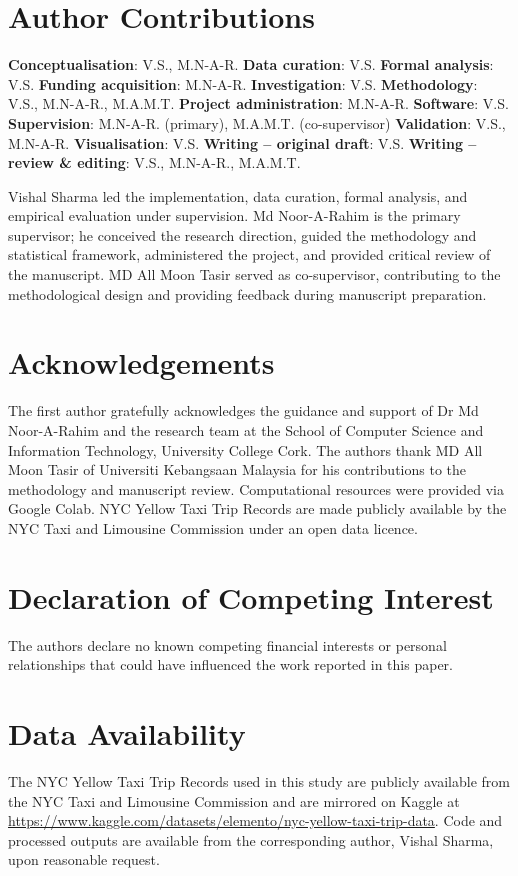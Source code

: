 \documentclass[a4paper,fleqn]{cas-dc}
\begin{document}
\section*{Author Contributions}
\textbf{Conceptualisation}: V.S., M.N-A-R.
\textbf{Data curation}: V.S.
\textbf{Formal analysis}: V.S.
\textbf{Funding acquisition}: M.N-A-R.
\textbf{Investigation}: V.S.
\textbf{Methodology}: V.S., M.N-A-R., M.A.M.T.
\textbf{Project administration}: M.N-A-R.
\textbf{Software}: V.S.
\textbf{Supervision}: M.N-A-R. (primary), M.A.M.T. (co-supervisor)
\textbf{Validation}: V.S., M.N-A-R.
\textbf{Visualisation}: V.S.
\textbf{Writing -- original draft}: V.S.
\textbf{Writing -- review \& editing}: V.S., M.N-A-R., M.A.M.T.

Vishal Sharma led the implementation, data curation, formal analysis, and empirical evaluation under supervision.  Md Noor-A-Rahim is the primary supervisor; he conceived the research direction, guided the methodology and statistical framework, administered the project, and provided critical review of the manuscript.  MD All Moon Tasir served as co-supervisor, contributing to the methodological design and providing feedback during manuscript preparation.

\section*{Acknowledgements}
The first author gratefully acknowledges the guidance and support of Dr Md Noor-A-Rahim and the research team at the School of Computer Science and Information Technology, University College Cork.  The authors thank MD All Moon Tasir of Universiti Kebangsaan Malaysia for his contributions to the methodology and manuscript review.  Computational resources were provided via Google Colab.  NYC Yellow Taxi Trip Records are made publicly available by the NYC Taxi and Limousine Commission under an open data licence.

\section*{Declaration of Competing Interest}
The authors declare no known competing financial interests or personal relationships that could have influenced the work reported in this paper.

\section*{Data Availability}
The NYC Yellow Taxi Trip Records used in this study are publicly available from the NYC Taxi and Limousine Commission and are mirrored on Kaggle at \url{https://www.kaggle.com/datasets/elemento/nyc-yellow-taxi-trip-data}.  Code and processed outputs are available from the corresponding author, Vishal Sharma, upon reasonable request.



\end{document}
